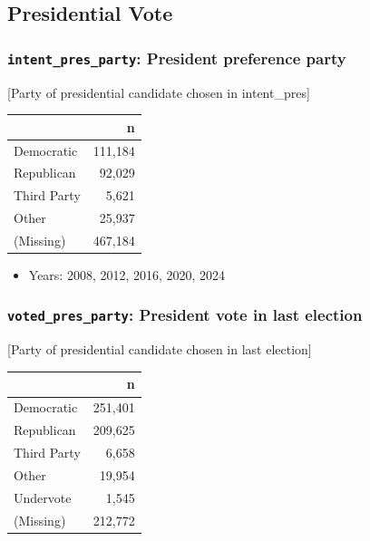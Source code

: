 \documentclass[10pt,article,oneside]{memoir}
\begin{document}
\subsection{Presidential Vote}\label{presidential-vote}

\subsubsection{\texorpdfstring{\texttt{intent\_pres\_party}: President
preference
party}{intent\_pres\_party: President preference party}}\label{intent_pres_party-president-preference-party}

{[}Party of presidential candidate chosen in intent\_pres{]}

\begin{table}[H]
\centering
\begin{tabular}[t]{lr}
\toprule
 & n\\
\midrule
Democratic & 111,184\\
Republican & 92,029\\
Third Party & 5,621\\
Other & 25,937\\
(Missing) & 467,184\\
\bottomrule
\end{tabular}
\end{table}

\begin{itemize}
\tightlist
\item
  Years: 2008, 2012, 2016, 2020, 2024
\end{itemize}

\subsubsection{\texorpdfstring{\texttt{voted\_pres\_party}: President
vote in last
election}{voted\_pres\_party: President vote in last election}}\label{voted_pres_party-president-vote-in-last-election}

{[}Party of presidential candidate chosen in last election{]}

\begin{table}[H]
\centering
\begin{tabular}[t]{lr}
\toprule
 & n\\
\midrule
Democratic & 251,401\\
Republican & 209,625\\
Third Party & 6,658\\
Other & 19,954\\
Undervote & 1,545\\
(Missing) & 212,772\\
\bottomrule
\end{tabular}
\end{table}
\end{document}
